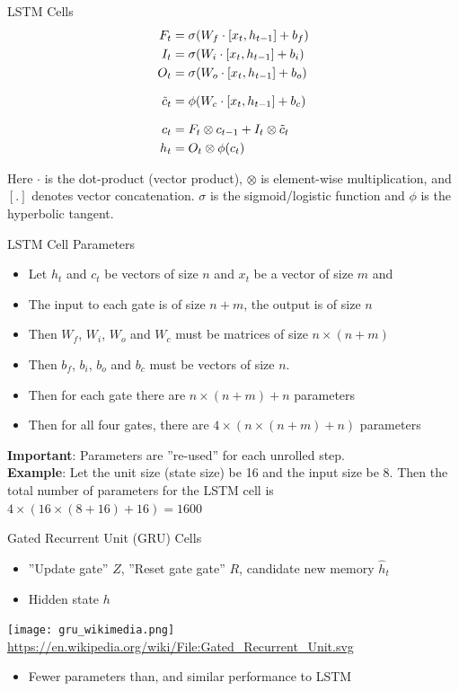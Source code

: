 \documentclass[ignorenonframetext,xcolor=x11names]{beamer}
\begin{document}
\begin{frame}{LSTM Cells}
\begin{align*}
F_t &= \sigma (W_f \cdot [ x_t, h_{t-1}] + b_f) \\
I_t &= \sigma (W_i \cdot [ x_t, h_{t-1}] + b_i) \\
O_t &= \sigma (W_o \cdot [ x_t, h_{t-1}] + b_o) \\[.5\baselineskip]
\tilde{c}_t &= \phi (W_c \cdot [ x_t, h_{t-1}] + b_c) \\[.5\baselineskip]
c_t &= F_t \otimes c_{t-1} + I_t \otimes \tilde{c}_t \\
h_t &= O_t \otimes \phi(c_t) 
\end{align*}

\small
Here $\cdot$ is the dot-product (vector product), $\otimes$ is element-wise multiplication, and $[.]$ denotes vector concatenation. $\sigma$ is the sigmoid/logistic function and $\phi$ is the hyperbolic tangent.
\end{frame}

\begin{frame}{LSTM Cell Parameters}
\small
\begin{itemize}
  \item Let $h_t$ and $c_t$ be vectors of size $n$ and $x_t$ be a vector of size $m$ and 
  \item The input to each gate is of size $n+m$, the output is of size $n$
  \item Then $W_f$, $W_i$, $W_o$ and $W_c$ must be matrices of size $n \times (n+m)$
  \item Then $b_f$, $b_i$, $b_o$ and $b_c$ must be vectors of size $n$. 
  \item Then for each gate there are $n \times (n+m) + n$ parameters
  \item Then for all four gates, there are $4 \times (n \times (n+m) + n)$ parameters
\end{itemize}
\textbf{Important}: Parameters are ''re-used'' for each unrolled step.\\

\textbf{Example}: Let the unit size (state size) be 16 and the input size be 8. Then the total number of parameters for the LSTM cell is $4 \times (16 \times (8+16) + 16) = 1600$
\end{frame}

\begin{frame}{Gated Recurrent Unit (GRU) Cells}
\begin{itemize}
   \item ''Update gate'' $Z$, ''Reset gate gate'' $R$, candidate new memory $\hat{h}_t$
   \item Hidden state $h$
\end{itemize}
\begin{center}
\texttt{[image: gru\_wikimedia.png]}
\scriptsize \url{https://en.wikipedia.org/wiki/File:Gated_Recurrent_Unit.svg} \normalsize
\end{center}
\begin{itemize}
   \item Fewer parameters than, and similar performance to LSTM
\end{itemize}
\end{frame}
\end{document}
